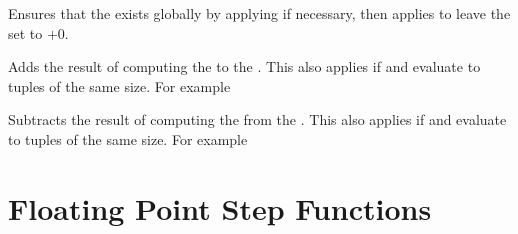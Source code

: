 \documentclass[oneside]{book}
\begin{document}
\begin{function}{\FpZeroNew}
\begin{syntax}
 
\end{syntax}
Ensures that the  exists globally
by applying  if necessary, then applies
 to leave the  set to $+0$.
\end{function}

\begin{function}{\FpAdd}
\begin{syntax}
  
\end{syntax}
Adds the result of computing the  to
the .
This also applies if  and  evaluate to tuples of the same size. For example
\begin{demohigh}
\FpSet {}
\FpAdd {}
\FpUse \lTmpaFp
\end{demohigh}
\end{function}

\begin{function}{\FpSub}
\begin{syntax}
  
\end{syntax}
Subtracts the result of computing the  from the .
This also applies if  and  evaluate to tuples of the same size. For example
\begin{demohigh}
\FpSet {}
\FpSub {}
\FpUse \lTmpaFp
\end{demohigh}
\end{function}

\section{Floating Point Step Functions}
\end{document}
